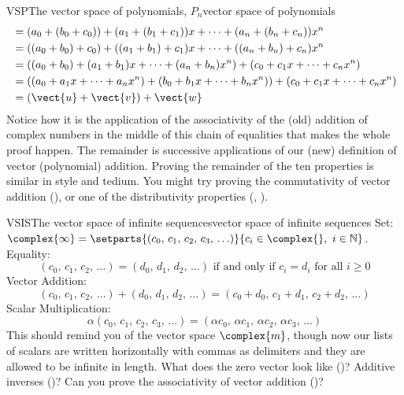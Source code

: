 \begin{example}{VSP}{The vector space of polynomials, $P_n$}{vector space of polynomials}
\begin{align*}
%
&=(a_0+(b_0+c_0))+(a_1+(b_1+c_1))x+\cdots+(a_n+(b_n+c_n))x^n\\
%
&=((a_0+b_0)+c_0)+((a_1+b_1)+c_1)x+\cdots+((a_n+b_n)+c_n)x^n\\
%
&=((a_0+b_0)+(a_1+b_1)x+\cdots+(a_n+b_n)x^n)+(c_0+c_1x+\cdots+c_nx^n)\\
%
&=\left((a_0+a_1x+\cdots+a_nx^n)+(b_0+b_1x+\cdots+b_nx^n)\right)+(c_0+c_1x+\cdots+c_nx^n)\\
%
&=(\vect{u}+\vect{v})+\vect{w}
%
\end{align*}
%
Notice how it is the application of the associativity of the (old) addition of complex numbers in the middle of this chain of equalities that makes the whole proof happen.  The remainder is successive applications of our (new) definition of vector (polynomial) addition.  Proving the remainder of the ten properties is similar in style and tedium.  You might try proving the commutativity of vector addition (), or one of the distributivity properties (, ).
%
\end{example}
%
\begin{example}{VSIS}{The vector space of infinite sequences}{vector space of infinite sequences}
Set:\quad $\complex{\infty}=\setparts{(c_0,\,c_1,\,c_2,\,c_3,\,\ldots)}{c_i\in\complex{\null},\ i\in\mathbb{N}}$.\\
Equality:
%
\begin{equation*}
(c_0,\,c_1,\,c_2,\,\ldots)=(d_0,\,d_1,\,d_2,\,\ldots)\text{ if and only if }c_i=d_i\text{ for all }i\geq 0
\end{equation*}
%
Vector Addition:
%
\begin{equation*}
(c_0,\,c_1,\,c_2,\,\ldots)+(d_0,\,d_1,\,d_2,\,\ldots)=(c_0+d_0,\,c_1+d_1,\,c_2+d_2,\,\ldots)
\end{equation*}
%
Scalar Multiplication:
%
\begin{equation*}
\alpha (c_0,\,c_1,\,c_2,\,c_3,\,\ldots)=(\alpha c_0,\,\alpha c_1,\,\alpha c_2,\,\alpha c_3,\,\ldots)
\end{equation*}
%
This should remind you of the vector space $\complex{m}$, though now our lists of scalars are written horizontally with commas as delimiters and they are allowed to be infinite in length.  What does the zero vector look like ()?  Additive inverses ()?  Can you prove the associativity of vector addition ()?
\end{example}
%
